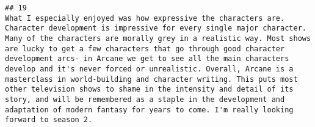 \documentclass[
]{article}
\begin{document}
\begin{verbatim}
## 19                                                                                                                                                                                                                                                                                                                                                                                                                                                                                                                                                                                                                                                                                                                                                                                                                                                                                                                                                                                                                                                                                                                                                                                                                                                                                                                                                                                                                                                                                                                                                                                                                                                                                                                                                                                                                                                                                                                                                                                                                                                                                                                                                                                                                                                                                                                                              What I especially enjoyed was how expressive the characters are. Character development is impressive for every single major character. Many of the characters are morally grey in a realistic way. Most shows are lucky to get a few characters that go through good character development arcs- in Arcane we get to see all the main characters develop and it's never forced or unrealistic. Overall, Arcane is a masterclass in world-building and character writing. This puts most other television shows to shame in the intensity and detail of its story, and will be remembered as a staple in the development and adaptation of modern fantasy for years to come. I'm really looking forward to season 2.
\end{verbatim}
\end{document}
